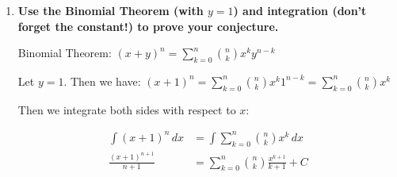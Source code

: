 \documentclass[10pt]{article}
\begin{document}
\begin{enumerate}
\begin{enumerate}
$$\frac{\bf 1}{1}+\frac{\bf 3}{2}+\frac{\bf3}{3}+\frac{\bf1}{4} = \frac{15}{4}$$

$$\frac{\bf1}{1}+\frac{\bf4}{2}+\frac{\bf6}{3}+\frac{\bf4}{4}+\frac{\bf1}{5} = \frac{31}{5}$$

$$\frac{\bf1}{1}+\frac{\bf5}{2}+\frac{\bf 10}{3}+\frac{ \bf10}{4}+\frac{\bf5}{5}+\frac{\bf1}{6} = \frac{63}{6}$$

From the result, we have this conjecture:

$$\sum\limits_{k=0}^n\binom{n}{k}\frac{1}{k+1} = \frac{2^{n+1} - 1}{n+1}$$

with $n \geq 1$

$$\frac{\bf 1}{1}+\frac{\bf 2}{2}+\frac{\bf 1}{3}=\frac{\binom{2}{0}}{1}+\frac{\binom{2}{1}}{2}+\frac{\binom{2}{2}}{3} = \sum\limits_{k=0}^2\binom{n}{k}\frac{1}{k+1} = \frac{2^3 - 1}{3}$$

$$\frac{\bf 1}{1}+\frac{\bf 3}{2}+\frac{\bf3}{3}+\frac{\bf1}{4} =\frac{\binom{3}{0}}{1}+\frac{\binom{3}{1}}{2}+\frac{\binom{3}{2}}{3} + \frac{\binom{3}{3}}{4} = \sum\limits_{k=0}^3\binom{n}{k}\frac{1}{k+1} = \frac{2^4 - 1}{4}$$

$$\frac{\bf1}{1}+\frac{\bf4}{2}+\frac{\bf6}{3}+\frac{\bf4}{4}+\frac{\bf1}{5} =\frac{\binom{4}{0}}{1}+\frac{\binom{4}{1}}{2}+\frac{\binom{4}{2}}{3} + \frac{\binom{4}{3}}{4} + \frac{\binom{4}{4}}{5} = \sum\limits_{k=0}^4\binom{n}{k}\frac{1}{k+1} = \frac{2^5 - 1}{5}$$

$$\frac{\bf1}{1}+\frac{\bf5}{2}+\frac{\bf 10}{3}+\frac{ \bf10}{4}+\frac{\bf5}{5}+\frac{\bf1}{6} = \frac{\binom{5}{0}}{1}+\frac{\binom{5}{1}}{2}+\frac{\binom{5}{2}}{3} + \frac{\binom{5}{3}}{4} + \frac{\binom{5}{4}}{5} + \frac{\binom{5}{5}}{6}= \sum\limits_{k=0}^5\binom{n}{k}\frac{1}{k+1} = \frac{2^6 - 1}{6}$$

\item
\textbf{Use the Binomial Theorem (with $y=1$) and integration (don't forget the constant!) to prove your conjecture.}

Binomial Theorem: $(x+y)^n=\sum\limits_{k=0}^n\binom{n}{k}x^ky^{n-k}$

Let $y = 1$. Then we have: $(x+1)^n=\sum\limits_{k=0}^n\binom{n}{k}x^k1^{n-k}=\sum\limits_{k=0}^n\binom{n}{k}x^k$

Then we integrate both sides with respect to $x$:

\begin{align*}
    \int (x+1)^n \,dx &= \int\sum\limits_{k=0}^n\binom{n}{k}x^k \,dx \\
    \frac{(x+1)^{n+1}}{n+1} &= \sum\limits_{k=0}^n\binom{n}{k}\frac{x^{k+1}}{k+1} + C\\
\end{align*}


\end{enumerate}
\end{enumerate}
\end{document}
